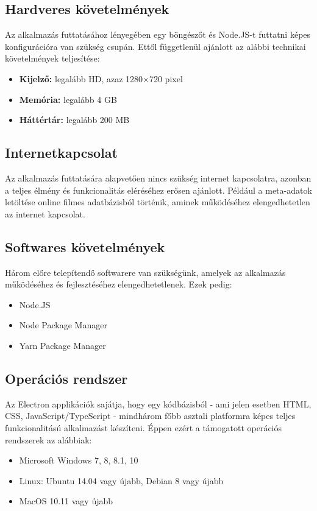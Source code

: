 \subsection{Hardveres követelmények}
Az alkalmazás futtatásához lényegében egy böngészőt és Node.JS-t futtatni képes konfigurációra van szükség csupán. Ettől függetlenül ajánlott az alábbi technikai követelmények teljesítése:
\begin{itemize}
    \item {\textbf {Kijelző: }} legalább HD, azaz 1280×720 pixel
	\item {\textbf {Memória: }} legalább 4 GB
	\item {\textbf {Háttértár: }} legalább 200 MB
\end{itemize}

\subsection{Internetkapcsolat}
Az alkalmazás futtatására alapvetően nincs szükség internet kapcsolatra, azonban a teljes élmény és funkcionalitás eléréséhez erősen ajánlott. Például a meta-adatok letöltése online filmes adatbázisból történik, aminek működéséhez elengedhetetlen az internet kapcsolat.

\subsection{Softwares követelmények}
Három előre telepítendő softwarere van szükségünk, amelyek az alkalmazás működéséhez és fejlesztéséhez elengedhetetlenek. Ezek pedig:
\begin{itemize}
	\item Node.JS
	\item Node Package Manager
	\item Yarn Package Manager
\end{itemize}

\subsection{Operációs rendszer}
Az Electron applikációk sajátja, hogy egy kódbázisból - ami jelen esetben HTML, CSS, JavaScript/TypeScript - mindhárom főbb asztali platformra képes teljes funkcionalitású alkalmazást készíteni. Éppen ezért a támogatott operációs rendszerek az alábbiak:
\begin{itemize}
	\item Microsoft Windows 7, 8, 8.1, 10
	\item Linux: Ubuntu 14.04 vagy újabb, Debian 8 vagy újabb
	\item MacOS 10.11 vagy újabb
\end{itemize}

